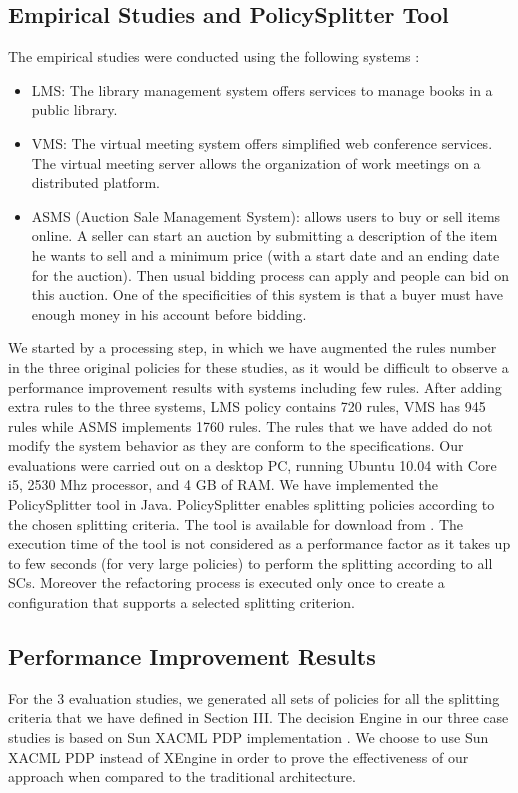 \subsection{Empirical Studies and PolicySplitter Tool}
The empirical studies were conducted using the following systems \cite{testcase}:
\begin{itemize}	
\item LMS: The library management system offers services to manage books in a public library.
\item VMS: The virtual meeting system offers simplified web conference services. The virtual meeting server allows the organization of work meetings on 
a distributed platform.
\item ASMS (Auction Sale Management System): allows users to buy or sell items online. A seller can start an auction by submitting a description of the
item he wants to sell and a minimum price (with a start date and an ending date for the auction). Then usual bidding process can apply and people can bid 
on this auction. One of the specificities of this system is that a buyer must have enough money in his account before bidding.
\end{itemize}
We started by a processing step, in which we have augmented the rules number in the three original policies for these studies, as it would be difficult
 to observe a performance improvement results with systems including few rules. After adding extra rules to the three systems, LMS policy contains 720 rules, 
VMS has 945 rules while ASMS implements 1760 rules. 
The rules that we have added do not modify the system behavior as they are conform to the specifications. Our evaluations were carried out on a desktop PC, 
running Ubuntu 10.04 with Core i5, 2530 Mhz processor, and 4 GB of RAM. 
We have implemented the PolicySplitter tool in Java. PolicySplitter enables splitting policies according to the chosen splitting criteria. 
The tool is available for download from \cite{splitter}.
The execution time of the tool is not considered as a performance factor as it takes up to few seconds (for very large policies) to perform the splitting 
according to all SCs. Moreover the refactoring process is executed only once to create a configuration that supports a selected splitting criterion.


\subsection{Performance Improvement Results}
For the 3 evaluation studies, we generated all sets of policies for all the splitting criteria that we have defined in Section III.
The decision Engine in our three case studies is based on Sun XACML PDP implementation \cite{sunxacml}. We choose to use Sun XACML PDP instead of XEngine in order 
to prove the effectiveness of our approach when compared to the traditional architecture.



